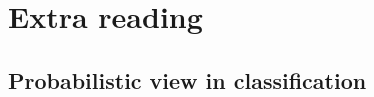 \documentclass[serif, aspectratio=169]{beamer}
\begin{document}


\section{Extra reading}
\subsection{Probabilistic view in classification}

    
\end{document}
